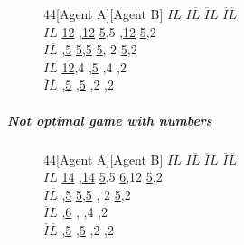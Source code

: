 \documentclass[10.5pt]{article}
\begin{document}
\begin{figure}[h]
\begin{center}
\begin{footnotesize}
\begin{game}{4}{4}[Agent A][Agent B]
       						 \> $IL$  	\> $I\overline{L}$ 	\> $\overline{I}L$  \> $\overline{I}\overline{L}$   \\
$IL$     					 \> \underline{12} ,\underline{12}  	\> \underline{5},5   		,\underline{12}			\> \underline{5},2  \\
$I\overline{L}$   			 ,\underline{5}  	\> \underline{5},\underline{5}    	\> \underline{5}, 2 				\> \underline{5},2\\
$\overline{I}L$      		 \> \underline{12},4  	,\underline{5}    			,4 					,2  \\
$\overline{I}\overline{L}$   ,\underline{5} 	,\underline{5}   			\> 2,2 					,2 \\
\end{game}
\end{footnotesize}
\end{center}
\end{figure}
\subparagraph{Not optimal game with numbers}
\begin{figure}[h]
\begin{center}
\begin{footnotesize}
\begin{game}{4}{4}[Agent A][Agent B]
       						 \> $IL$  	\> $I\overline{L}$ 	\> $\overline{I}L$  \> $\overline{I}\overline{L}$   \\
$IL$     					 \> \underline{14} ,\underline{14}  	\> \underline{5},5   		\> \underline{6},12			\> \underline{5},2  \\
$I\overline{L}$   			 ,\underline{5}  	\> \underline{5},\underline{5}    	, 2 				\> \underline{5},2\\
$\overline{I}L$      		 ,\underline{6}  	,	  			,4 					\> 2,2  \\
$\overline{I}\overline{L}$   ,\underline{5} 	,\underline{5}   			\> 2,2 					,2 \\
\end{game}
\end{footnotesize}
\end{center}
\end{figure}
\end{document}
